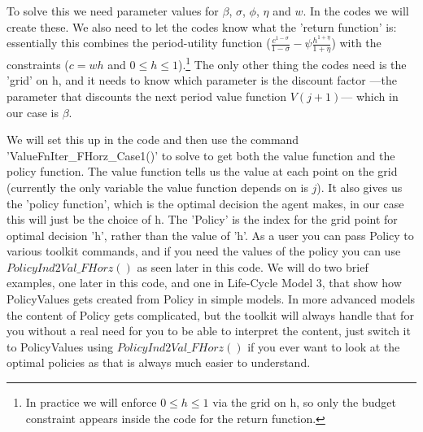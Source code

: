 To solve this we need parameter values for $\beta$, $\sigma$, $\phi$, $\eta$ and $w$. In the codes we will create these. We also need to let the codes know what the 'return function' is: essentially this combines the period-utility function ($\frac{c^{1-\sigma}}{1-\sigma} - \psi \frac{h^{1+\eta}}{1+\eta}$) with the constraints ($c= w h$ and $0\leq h \leq 1$).\footnote{In practice we will enforce $0\leq h \leq 1$ via the grid on h, so only the budget constraint appears inside the code for the return function.} The only other thing the codes need is the 'grid' on h, and it needs to know which parameter is the discount factor ---the parameter that discounts the next period value function $V(j+1)$--- which in our case is $\beta$.

We will set this up in the code and then use the command 'ValueFnIter\_{}FHorz\_{}Case1()' to solve to get both the value function and the policy function. The value function tells us the value at each point on the grid (currently the only variable the value function depends on is $j$). It also gives us the 'policy function', which is the optimal decision the agent makes, in our case this will just be the choice of h. The 'Policy' is the index for the grid point for optimal decision 'h', rather than the value of 'h'. As a user you can pass Policy to various toolkit commands, and if you need the values of the policy you can use $PolicyInd2Val\_{}FHorz()$ as seen later in this code. We will do two brief examples, one later in this code, and one in Life-Cycle Model 3, that show how PolicyValues gets created from Policy in simple models. In more advanced models the content of Policy gets complicated, but the toolkit will always handle that for you without a real need for you to be able to interpret the content, just switch it to PolicyValues using $PolicyInd2Val\_{}FHorz()$ if you ever want to look at the optimal policies as that is always much easier to understand.


